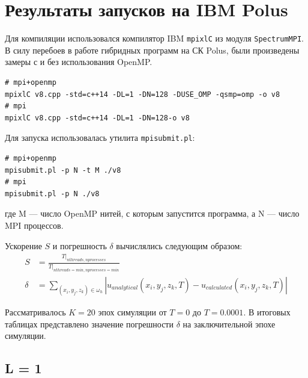 \documentclass[a4paper,hidelinks,12pt]{article}
\begin{document}
\section{Результаты запусков на IBM Polus}

Для компиляции использовался компилятор IBM \texttt{mpixlC} из модуля \texttt{SpectrumMPI}. В силу перебоев в работе гибридных программ на СК Polus, были произведены замеры с и без использования OpenMP.
% 
\begin{verbatim}
# mpi+openmp
mpixlC v8.cpp -std=c++14 -DL=1 -DN=128 -DUSE_OMP -qsmp=omp -o v8
# mpi
mpixlC v8.cpp -std=c++14 -DL=1 -DN=128-o v8
\end{verbatim}

Для запуска использовалась утилита \texttt{mpisubmit.pl}:
% 
\begin{verbatim}
# mpi+openmp
mpisubmit.pl -p N -t M ./v8
# mpi
mpisubmit.pl -p N ./v8
\end{verbatim}
% 
\noindent где M  --- число OpenMP нитей, с которым запустится программа, а N --- число MPI процессов.
% 

Ускорение $S$ и погрешность $\delta$ вычислялись следующим образом:
\begin{align*}
    S &= \frac{T|_{n threads, nprocesses}}{T|_{n threads = min, nprocesses=min}} \\
    \delta &= \sum_{(x_i, y_j, z_k) \in \omega_h} \left| u_{analytical}(x_i, y_j, z_k, T) - u_{calculated}(x_i, y_j, z_k, T) \right|
\end{align*}

Рассматривалось $K=20$ эпох симуляции от $T=0$ до $T=0.0001$. В итоговых таблицах представлено значение погрешности $\delta$ на заключительной эпохе симуляции.

\subsection{L = 1}
\end{document}
